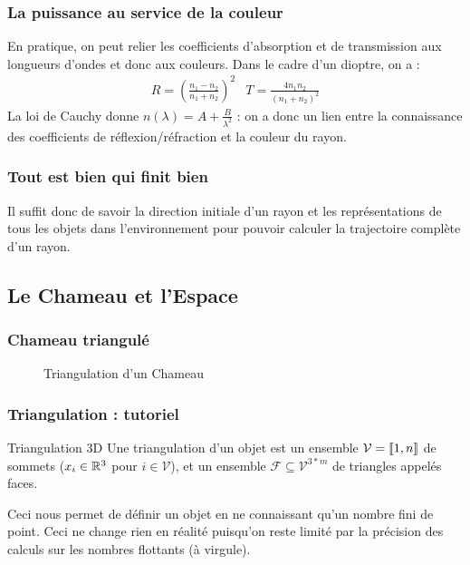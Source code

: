 \documentclass{beamercours}
\begin{document}
\begin{frame}
\frametitle{La puissance au service de la couleur}
En pratique, on peut relier les coefficients d'absorption et de transmission aux longueurs d'ondes et donc aux couleurs. Dans le cadre d'un dioptre, on a :
	\begin{equation*}
		\begin{array}{cc}
			R = \left(\frac{n_1-n_2}{n_1+n_2}\right)^2 & T = \frac{4n_1n_2}{(n_1+n_2)^2}
		\end{array}
	\end{equation*}
La loi de Cauchy donne $n(\lambda) = A + \frac{B}{\lambda^2}$ : on a donc un lien entre la connaissance des coefficients de réflexion/réfraction et la couleur du rayon.
\end{frame}
\begin{frame}
\frametitle{Tout est bien qui finit bien}
Il suffit donc de savoir la direction initiale d'un rayon et les représentations de tous les objets dans l'environnement pour pouvoir calculer la trajectoire complète d'un rayon.
\end{frame}

\subsection{Le Chameau et l'Espace}

\begin{frame}
\frametitle{Chameau triangulé}
\begin{figure}[h]
\centering
{}
\caption{Triangulation d'un Chameau}
\label{fig:camel}
\end{figure}
\end{frame}

\begin{frame}
\frametitle{Triangulation : tutoriel}
\begin{définition}{Triangulation 3D}{}
	Une triangulation d'un objet est un ensemble $\mathcal{V} = \left\llbracket 1, n\right\rrbracket$ de sommets ($x_{i} \in \mathbb{R}^{3}$ pour $i \in \mathcal{V}$), et un ensemble $\mathcal{F} \subseteq \mathcal{V}^{3 * m}$ de triangles appelés faces.
\end{définition}

Ceci nous permet de définir un objet en ne connaissant qu'un nombre fini de point.
Ceci ne change rien en réalité puisqu'on reste limité par la précision des calculs sur les nombres flottants (à virgule).
\end{frame}
\end{document}
